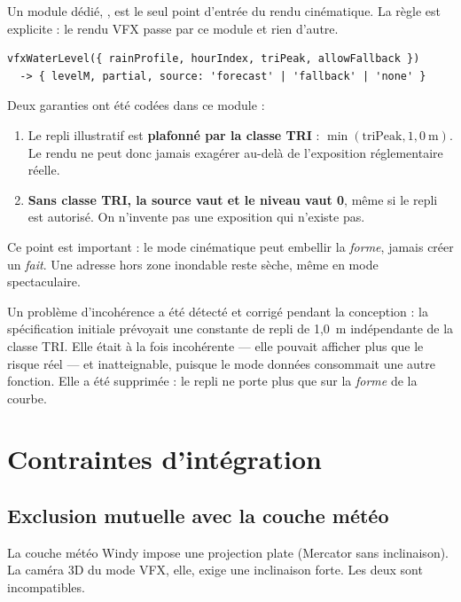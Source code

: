 Un module dédié, , est le seul point d'entrée du rendu
cinématique. La règle est explicite : le rendu VFX passe par ce module et rien
d'autre.

\begin{lstlisting}[caption={Le bus d'entrée du mode VFX et sa règle de repli.},
label={lst:vfxinputs}]
vfxWaterLevel({ rainProfile, hourIndex, triPeak, allowFallback })
  -> { levelM, partial, source: 'forecast' | 'fallback' | 'none' }
\end{lstlisting}

Deux garanties ont été codées dans ce module :

\begin{enumerate}[leftmargin=1.6em]
  \item Le repli illustratif est \textbf{plafonné par la classe TRI} :
        $\min(\text{triPeak}, 1{,}0~\text{m})$. Le rendu ne peut donc jamais
        exagérer au-delà de l'exposition réglementaire réelle.
  \item \textbf{Sans classe TRI, la source vaut  et le niveau
        vaut 0}, même si le repli est autorisé. On n'invente pas une exposition
        qui n'existe pas.
\end{enumerate}

Ce point est important : le mode cinématique peut embellir la \emph{forme},
jamais créer un \emph{fait}. Une adresse hors zone inondable reste sèche, même
en mode spectaculaire.

\begin{honesty}
Un problème d'incohérence a été détecté et corrigé pendant la conception : la
spécification initiale prévoyait une constante de repli de 1,0~m indépendante
de la classe TRI. Elle était à la fois incohérente — elle pouvait afficher plus
que le risque réel — et inatteignable, puisque le mode données consommait une
autre fonction. Elle a été supprimée : le repli ne porte plus que sur la
\emph{forme} de la courbe.
\end{honesty}

\section{Contraintes d'intégration}

\subsection{Exclusion mutuelle avec la couche météo}

La couche météo Windy impose une projection plate (Mercator sans inclinaison).
La caméra 3D du mode VFX, elle, exige une inclinaison forte. Les deux sont
incompatibles.


